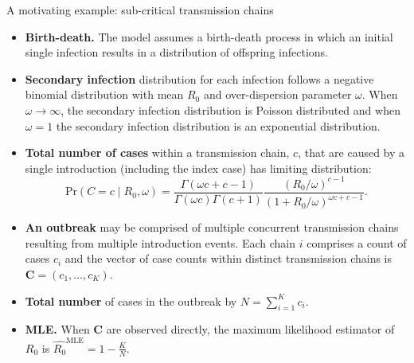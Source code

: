 \documentclass[final]{beamer}
\newcommand{\disp}{\omega}					%
\newcommand{\chain}{c}							%
\newcommand{\chains}{\mathbf{C}}		%
\newcommand{\nchains}{K}					  %
\newcommand{\ncases}{N}					    %
\newlength{\colwidth}
\begin{document}
\begin{frame}[t]
\begin{columns}[t]
\begin{column}{\colwidth}
\begin{block}{A motivating example: sub-critical transmission chains}
  \begin{itemize}
  \item \textbf{Birth-death.}  The model assumes a birth-death process in which an initial single infection results in a distribution of offspring infections.
  \item \textbf{Secondary infection} distribution for each infection follows a negative binomial distribution with mean $R_0$ and over-dispersion parameter $\disp$.
  When $\disp  \to \infty$, the secondary infection distribution is Poisson distributed and when $\disp = 1$  the secondary infection distribution is an exponential distribution.
  \item \textbf{Total number of cases} within a transmission chain, $\chain$, that are caused by a single introduction (including the index case) has limiting distribution:
  \begin{equation}
  \label{eq:R0_pmf}
  \text{Pr}(C = \chain \mid  R_0, \disp) = \frac{\Gamma(\disp \chain + \chain - 1)}{\Gamma(\disp \chain) \Gamma(\chain + 1)} \frac{(R_0/\disp)^{\chain-1}}{(1+R_0/\disp)^{\disp \chain + \chain - 1}}.
  \end{equation}
  \item \textbf{An outbreak} may be comprised of multiple concurrent transmission chains resulting from multiple introduction events.
  Each chain $i$ comprises a count of cases $\chain_i$ and the vector of case counts within distinct transmission chains is $\chains = (\chain_1, \ldots, \chain_\nchains)$.
  \item \textbf{Total number} of cases in the outbreak by $\ncases = \sum_{i=1}^\nchains \chain_i$.
  \item \textbf{MLE.} When $\chains$ are observed directly, the maximum likelihood estimator of $R_0$ is $\widehat{R_0}^{\text{MLE}} = 1 -\frac{K}{N}$.
  \end{itemize}
  

\end{block}
\end{column}
\end{columns}
\end{frame}
\end{document}
